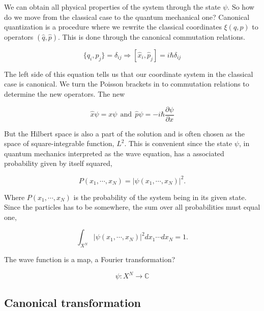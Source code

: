 We can obtain all physical properties of the system through the state $\psi$.
So how do we move from the classical case to the quantum mechanical one? Canonical quantization is a procedure where we rewrite the classical coordinates $\xi(q, p)$ to operators $(\hat{q}, \hat{p})$. This is done through the canonical commutation relations.

\begin{equation} \label{eq:commutation}
\{q_i, p_j\} = \delta_{ij} \Longrightarrow [\hat{x}_i, \hat{p}_j] = i \hbar \delta_{ij}
\end{equation}

The left side of this equation tells us that our coordinate system in the classical case is canonical. We turn the Poisson brackets in to commutation relations to determine the new operators. 
The new 

\begin{equation}
\hat{x}\psi = x \psi \ \ \text{and} \ \ \hat{p} \psi = -i \hbar \frac{\partial \psi}{\partial x}
\end{equation}

But the Hilbert space is also a part of the solution and is often chosen as the space of square-integrable function, $L^2$. This is convenient since the state $\psi$, in quantum mechanics interpreted as the wave equation, has a associated probability given by itself squared,

\begin{equation}
P(x_1, \cdots, x_N) = |\psi(x_1, \cdots, x_N)|^2.
\end{equation}

Where $P(x_1, \cdots, x_N)$ is the probability of the system being in its given state. Since the particles has to be somewhere, the sum over all probabilities must equal one, 

\begin{equation}
\int_{X^N} |\psi(x_1, \cdots, x_N)|^2 d x_1 \cdots d x_N = 1.
\end{equation}

The wave function is a map, a Fourier transformation? 

\begin{equation}
\psi : X^N \longrightarrow \mathbb{C}
\end{equation}

\subsection{Canonical transformation}

